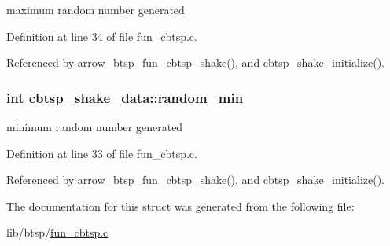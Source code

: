 maximum random number generated 

Definition at line 34 of file fun\_\-cbtsp.c.

Referenced by arrow\_\-btsp\_\-fun\_\-cbtsp\_\-shake(), and cbtsp\_\-shake\_\-initialize().\hypertarget{structcbtsp__shake__data_88e2f84442dd2fb0cfdf548de45dd4a2}{
\subsubsection[{random\_\-min}]{\setlength{\rightskip}{0pt plus 5cm}int {\bf cbtsp\_\-shake\_\-data::random\_\-min}}}
\label{structcbtsp__shake__data_88e2f84442dd2fb0cfdf548de45dd4a2}


minimum random number generated 

Definition at line 33 of file fun\_\-cbtsp.c.

Referenced by arrow\_\-btsp\_\-fun\_\-cbtsp\_\-shake(), and cbtsp\_\-shake\_\-initialize().

The documentation for this struct was generated from the following file:\begin{CompactItemize}
\item 
lib/btsp/\hyperlink{fun__cbtsp_8c}{fun\_\-cbtsp.c}\end{CompactItemize}
